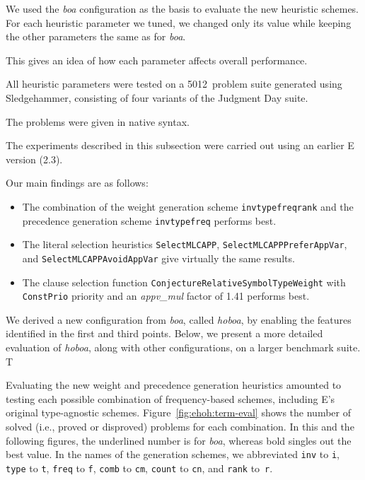 We used the \emph{boa} configuration as the basis to evaluate the new
heuristic schemes. For each heuristic parameter we tuned, we changed only its
value while keeping the other parameters the same as for \emph{boa}.
\begin{rep}This gives an idea of how each parameter affects overall
performance.\end{rep}
All heuristic parameters were tested on a 5012~problem suite generated
using Sledgehammer, consisting of four variants of the Judgment Day
\cite{bn-10-sh} suite.\begin{rep} The problems were given in native
\lfhol{} syntax.\end{rep} The experiments described in this subsection were
carried out using an earlier E version (2.3).\begin{conf}
Our main findings are as follows:
%
\begin{itemize}
\item The combination of the weight generation scheme \texttt{invtypefreqrank}
  and the precedence generation scheme \texttt{invtypefreq} performs best.

\smallskip
\item The literal selection heuristics \texttt{SelectMLCAPP},
  \texttt{SelectMLCAPPPreferAppVar}, and \texttt{SelectMLCAPPAvoidAppVar} give
  virtually the same results.

\smallskip
\item The clause selection function
  \texttt{ConjectureRelativeSymbolTypeWeight} with \texttt{ConstPrio} priority
  and an \textit{appv\_mul} factor of 1.41 performs best.
\end{itemize}

We derived a new configuration from \textit{boa}, called \textit{hoboa},
by enabling the features identified in the first and third points. Below, we
present a more detailed evaluation of \textit{hoboa}, along with other
configurations, on a larger benchmark suite. T%
\end{conf}%



Evaluating the new weight and pre\-cedence generation heuristics amounted to testing
each possible combination of frequency-based schemes, including E's original
type-agnostic schemes. Figure~\ref{fig:ehoh:term-eval} shows the number of
solved (i.e., proved or disproved) problems for each combination. In this and
the following figures, the underlined number is for \emph{boa}, whereas bold
singles out the best value. In the names of the generation schemes, we abbreviated
\texttt{inv} to \texttt{i}, \texttt{type} to \texttt{t}, \texttt{freq} to
\texttt{f}, \texttt{comb} to \texttt{cm}, \texttt{count} to \texttt{cn}, and
\texttt{rank} to~\texttt{r}.

